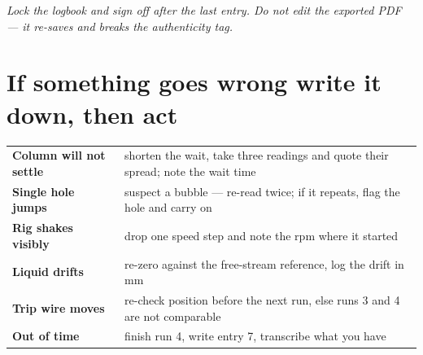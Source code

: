 \documentclass[10pt,a4paper]{article}
\begin{document}
\vspace{2pt}
{\small\itshape Lock the logbook and sign off after the last entry. Do not edit the exported PDF --- it re-saves and breaks the authenticity tag.}

\section*{If something goes wrong \hfill \normalsize write it down, then act}

\begin{tabularx}{\textwidth}{@{}>{\bfseries}p{4.2cm}X@{}}
\toprule
Column will not settle & shorten the wait, take three readings and quote their spread; note the wait time \\
Single hole jumps & suspect a bubble --- re-read twice; if it repeats, flag the hole and carry on \\
Rig shakes visibly & drop one speed step and note the rpm where it started \\
Liquid drifts & re-zero against the free-stream reference, log the drift in mm \\
Trip wire moves & re-check position before the next run, else runs 3 and 4 are not comparable \\
Out of time & finish run 4, write entry 7, transcribe what you have \\
\bottomrule
\end{tabularx}
\end{document}

